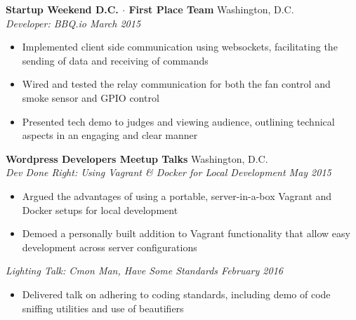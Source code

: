 \documentclass[10pt]{extarticle}
\begin{document}
\textbf{Startup Weekend D.C. $\cdot$ First Place Team} \hfill Washington, D.C. \\
\textit{Developer: BBQ.io \hfill March 2015} \\
\vspace{-1.1em}
\begin{itemize}
  \item Implemented client side communication using websockets, facilitating the sending of data and receiving of commands
  \item Wired and tested the relay communication for both the fan control and smoke sensor and GPIO control
  \item Presented tech demo to judges and viewing audience, outlining technical aspects in an engaging and clear manner
\end{itemize}
\textbf{Wordpress Developers Meetup Talks} \hfill Washington, D.C. \\
\textit{Dev Done Right: Using Vagrant \& Docker for Local Development \hfill May 2015} \\
\vspace{-1.1em}
\begin{itemize}
  \item Argued the advantages of using a portable, server-in-a-box Vagrant and Docker setups for local development
  \item Demoed a personally built addition to Vagrant functionality that allow easy development across server configurations
\end{itemize}
\textit{Lighting Talk: C\textquotesingle{}mon Man, Have Some Standards \hfill February 2016} \\
\vspace{-1.1em}
\begin{itemize}
  \item Delivered talk on adhering to coding standards, including demo of code sniffing utilities and use of beautifiers
\end{itemize}
\end{document}
